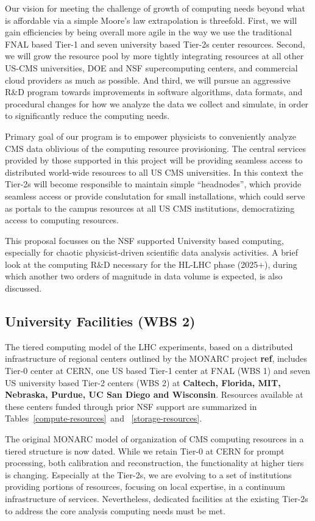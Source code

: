 \documentclass[11pt,a4paper]{article}
\begin{document}
Our vision for meeting the challenge of growth of computing needs
beyond what is affordable via a simple Moore's law extrapolation is
threefold. First, we will gain efficiencies by being overall more
agile in the way we use the traditional FNAL based Tier-1 and seven
university based Tier-2s center resources. Second, we will grow the
resource pool by more tightly integrating resources at all other
US-CMS universities, DOE and NSF supercomputing centers, and
commercial cloud providers as much as possible. And third, we will
pursue an aggressive R\&D program towards improvements in software
algorithms, data formats, and procedural changes for how we analyze
the data we collect and simulate, in order to significantly reduce the
computing needs.

Primary goal of our program is to empower physicists to conveniently
analyze CMS data oblivious of the computing resource provisioning.
The central services provided by those supported in this project
will be providing seamless access to distributed world-wide 
resources to all US CMS universities.  In this context the 
Tier-2s will become responsible to maintain simple ``headnodes'',
which provide seamless access or provide conslutation for small 
installations, which could serve as portals to the campus
resources at all US CMS institutions, democratizing access to
computing resources.  

This proposal focusses on the NSF supported University
based computing, especially for chaotic physicist-driven
scientific data analysis activities. A brief look at the computing 
R\&D necessary for the HL-LHC phase (2025+), during which 
another two orders of magnitude in data volume is expected, 
is also discussed.

\subsection{University Facilities (WBS 2)}

The tiered computing model of the LHC experiments, based on a 
distributed infrastructure of regional centers outlined by
the MONARC project {\bf ref}, includes Tier-0 center at CERN,
one US based Tier-1 center at FNAL (WBS 1) and seven US 
university based Tier-2 centers (WBS 2) at 
{\bf Caltech, Florida, MIT, Nebraska, Purdue, UC San Diego and Wisconsin}.
Resources available at these centers funded through prior NSF
support are summarized in Tables~\ref{compute-resources}~and~
\ref{storage-resources}.

The original MONARC model of organization of CMS computing resources
in a tiered structure is now dated. While we retain Tier-0 at CERN for
prompt processing, both calibration and reconstruction, the
functionality at higher tiers is changing. Especially at the Tier-2s,
we are evolving to a set of institutions providing portions of
resources, focusing on local expertise, in a continuum infrastructure
of services. Nevertheless, dedicated facilities at the existing
Tier-2s to address the core analysis computing needs must be met.
\end{document}
